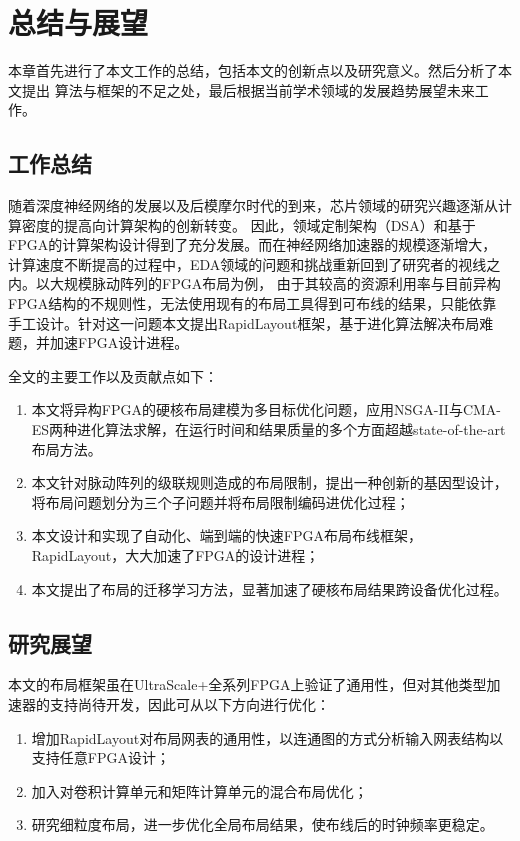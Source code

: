 \chapter{总结与展望}

本章首先进行了本文工作的总结，包括本文的创新点以及研究意义。然后分析了本文提出
算法与框架的不足之处，最后根据当前学术领域的发展趋势展望未来工作。

\section{工作总结}

随着深度神经网络的发展以及后模摩尔时代的到来，芯片领域的研究兴趣逐渐从计算密度的提高向计算架构的创新转变。
因此，领域定制架构（DSA）和基于FPGA的计算架构设计得到了充分发展。而在神经网络加速器的规模逐渐增大，
计算速度不断提高的过程中，EDA领域的问题和挑战重新回到了研究者的视线之内。以大规模脉动阵列的FPGA布局为例，
由于其较高的资源利用率与目前异构FPGA结构的不规则性，无法使用现有的布局工具得到可布线的结果，只能依靠
手工设计。针对这一问题本文提出RapidLayout框架，基于进化算法解决布局难题，并加速FPGA设计进程。

全文的主要工作以及贡献点如下：


\begin{enumerate}
    \item 本文将异构FPGA的硬核布局建模为多目标优化问题，应用NSGA-II与CMA-ES两种进化算法求解，在运行时间和结果质量的多个方面超越state-of-the-art布局方法。
    \item 本文针对脉动阵列的级联规则造成的布局限制，提出一种创新的基因型设计，将布局问题划分为三个子问题并将布局限制编码进优化过程；    
    \item 本文设计和实现了自动化、端到端的快速FPGA布局布线框架，RapidLayout，大大加速了FPGA的设计进程；
    \item 本文提出了布局的迁移学习方法，显著加速了硬核布局结果跨设备优化过程。
\end{enumerate}



\section{研究展望}

本文的布局框架虽在UltraScale+全系列FPGA上验证了通用性，但对其他类型加速器的支持尚待开发，因此可从以下方向进行优化：

\begin{enumerate}
    \item 增加RapidLayout对布局网表的通用性，以连通图的方式分析输入网表结构以支持任意FPGA设计；
    \item 加入对卷积计算单元和矩阵计算单元的混合布局优化；
    \item 研究细粒度布局，进一步优化全局布局结果，使布线后的时钟频率更稳定。
\end{enumerate}
